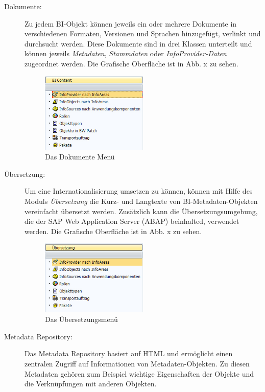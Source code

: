 \begin{description}
\item[Dokumente:] Zu jedem BI-Objekt können jeweils ein oder mehrere Dokumente in verschiedenen Formaten, Versionen und Sprachen hinzugefügt, verlinkt und durchsucht werden. Diese Dokumente sind in drei Klassen unterteilt und können jeweils \textit{Metadaten}, \textit{Stammdaten} oder \textit{InfoProvider-Daten} zugeordnet werden.
Die Grafische Oberfläche ist in Abb. x zu sehen.
\begin{figure}[H]
    \centering
    \includegraphics[width=0.5\textwidth]{files/BIContent}
    \caption{Das Dokumente Menü}
    \label{pic:DWOverview}
\end{figure}
\item[Übersetzung:] Um eine Internationalisierung umsetzen zu können, können mit Hilfe des Moduls \textit{Übersetzung} die Kurz- und Langtexte von BI-Metadaten-Objekten vereinfacht übersetzt werden. Zusätzlich kann die Übersetzungsumgebung, die der SAP Web Application Server (ABAP) beinhalted, verwendet werden.
Die Grafische Oberfläche ist in Abb. x zu sehen.
\begin{figure}[H]
    \centering
    \includegraphics[width=0.5\textwidth]{files/Uebersetzung}
    \caption{Das Übersetzungsmenü}
    \label{pic:DWOverview}
\end{figure}
\item[Metadata Repository:] Das Metadata Repository basiert auf HTML und ermöglicht einen zentralen Zugriff auf Informationen von Metadaten-Objekten. Zu diesen Metadaten gehören zum Beispiel wichtige Eigenschaften der Objekte und die Verknüpfungen mit anderen Objekten.
\end{description}




